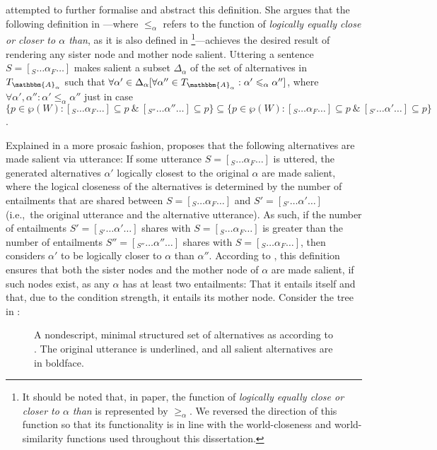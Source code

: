 \textcite{Ippolito2020} attempted to further formalise and abstract this definition. She argues that the following definition in ---where $\leqslant_\alpha$ refers to the function of \textit{logically equally close or closer to $\alpha$ than}, as it is also defined in \footnote{It should be noted that, in  paper, the function of \textit{logically equally close or closer to $\alpha$ than} is represented by $\geqslant_\alpha$. We reversed the direction of this function so that its functionality is in line with the world-closeness and world-similarity functions used throughout this dissertation.}---achieves the desired result of rendering any sister node and mother node salient. 
\ex{}
{}
Uttering a sentence $S=[_S\ldots\alpha_F\ldots]$ makes salient a subset $\Delta_\alpha$ of the set of alternatives in $T_{\mathbbm{A}_\alpha}$ such that $\forall\alpha'\in\Delta_\alpha[\forall\alpha''\in T_{\mathbbm{A}_\alpha}: \alpha'\leqslant_\alpha \alpha'']$, where $\forall\alpha',\alpha'':\alpha'\leqslant_\alpha \alpha''$ just in case $\{p\in\wp(W):[_S\ldots\alpha_F\ldots]\subseteq p~\&~[_{S''}\ldots\alpha''\ldots]\subseteq p\}\subseteq\{p\in\wp(W):[_S\ldots\alpha_F\ldots]\subseteq p~\&~[_{S'}\ldots\alpha'\ldots]\subseteq p\}$.\\\emptyfill\parencite[p. 642]{Ippolito2020}
\xe

Explained in a more prosaic fashion, \textcite{Ippolito2020} proposes that the following alternatives are made salient via utterance: If some utterance $S=[_S\ldots\alpha_F\ldots]$ is uttered, the generated alternatives $\alpha'$ logically closest to the original $\alpha$ are made salient, where the logical closeness of the alternatives is determined by the number of entailments that are shared between $S=[_S\ldots\alpha_F\ldots]$ and $S'=[_{S'}\ldots\alpha'\ldots]$ (i.e.,~the original utterance and the alternative utterance). As such, if the number of entailments $S'=[_{S'}\ldots\alpha'\ldots]$ shares with $S=[_{S}\ldots\alpha_F\ldots]$ is greater than the number of entailments $S''=[_{S''}\ldots\alpha''\ldots]$ shares with $S=[_{S}\ldots\alpha_F\ldots]$, then \textcite{Ippolito2020} considers $\alpha'$ to be logically closer to $\alpha$ than $\alpha''$. According to \textcite{Ippolito2020}, this definition ensures that both the sister nodes and the mother node of $\alpha$ are made salient, if such nodes exist, as any $\alpha$ has at least two entailments: That it entails itself and that, due to the condition strength, it entails its mother node. Consider the tree in :
\begin{figure}[!htb]
    \centering
    \hspace{-7cm}
    \caption{A nondescript, minimal structured set of alternatives as according to \textcite{Ippolito2020}. The original utterance is underlined, and all salient alternatives are in boldface.}
\end{figure}

